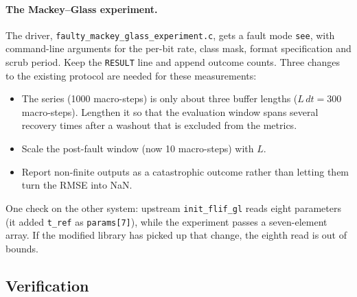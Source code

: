 \documentclass[11pt,a4paper]{article}
\begin{document}
\paragraph{The Mackey--Glass experiment.} The driver, \texttt{faulty\_mackey\_glass\_experiment.c}, gets a fault mode \texttt{see}, with command-line arguments for the per-bit rate, class mask, format specification and scrub period. Keep the \texttt{RESULT} line and append outcome counts. Three changes to the existing protocol are needed for these measurements:
\begin{itemize}
  \item The series (1000 macro-steps) is only about three buffer lengths ($L\,dt = 300$ macro-steps). Lengthen it so that the evaluation window spans several recovery times after a washout that is excluded from the metrics.
  \item Scale the post-fault window (now 10 macro-steps) with $L$.
  \item Report non-finite outputs as a catastrophic outcome rather than letting them turn the RMSE into NaN.
\end{itemize}
One check on the other system: upstream \texttt{init\_flif\_gl} reads eight parameters (it added \texttt{t\_ref} as \texttt{params[7]}), while the experiment passes a seven-element array. If the modified library has picked up that change, the eighth read is out of bounds.

\subsection{Verification}
\end{document}
